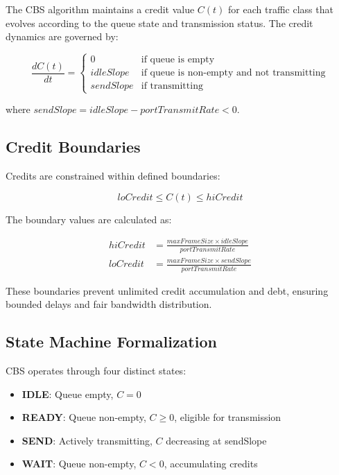 \documentclass[10pt, journal, compsoc]{IEEEtran}
\begin{document}
The CBS algorithm maintains a credit value $C(t)$ for each traffic class that evolves according to the queue state and transmission status. The credit dynamics are governed by:

\begin{equation}
\frac{dC(t)}{dt} = \begin{cases}
0 & \text{if queue is empty} \\
idleSlope & \text{if queue is non-empty and not transmitting} \\
sendSlope & \text{if transmitting}
\end{cases}
\end{equation}

where $sendSlope = idleSlope - portTransmitRate < 0$.

\subsection{Credit Boundaries}

Credits are constrained within defined boundaries:

\begin{equation}
loCredit \leq C(t) \leq hiCredit
\end{equation}

The boundary values are calculated as:

\begin{align}
hiCredit &= \frac{maxFrameSize \times idleSlope}{portTransmitRate} \\
loCredit &= \frac{maxFrameSize \times sendSlope}{portTransmitRate}
\end{align}

These boundaries prevent unlimited credit accumulation and debt, ensuring bounded delays and fair bandwidth distribution.

\subsection{State Machine Formalization}

CBS operates through four distinct states:

\begin{itemize}
    \item \textbf{IDLE}: Queue empty, $C = 0$
    \item \textbf{READY}: Queue non-empty, $C \geq 0$, eligible for transmission
    \item \textbf{SEND}: Actively transmitting, $C$ decreasing at sendSlope
    \item \textbf{WAIT}: Queue non-empty, $C < 0$, accumulating credits
\end{itemize}
\end{document}

